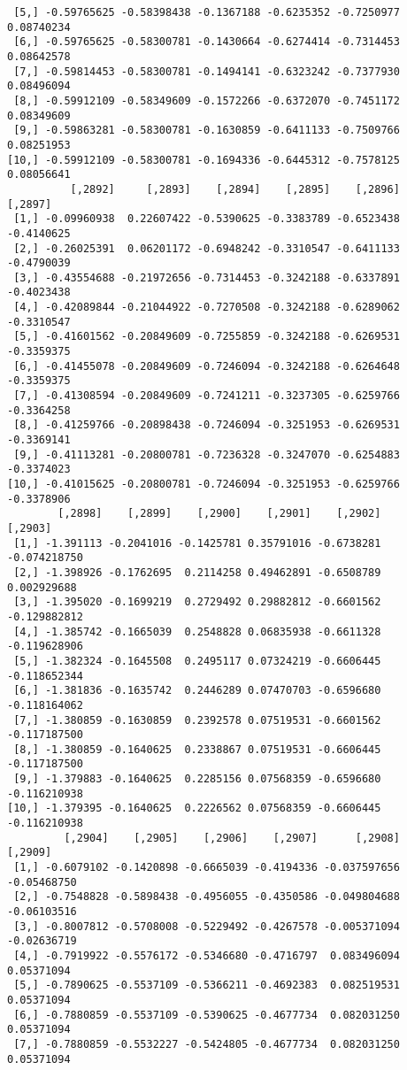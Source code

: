 \documentclass[
  letterpaper,
  DIV=11,
  numbers=noendperiod]{scrreprt}
\begin{document}
\begin{verbatim}
 [5,] -0.59765625 -0.58398438 -0.1367188 -0.6235352 -0.7250977  0.08740234
 [6,] -0.59765625 -0.58300781 -0.1430664 -0.6274414 -0.7314453  0.08642578
 [7,] -0.59814453 -0.58300781 -0.1494141 -0.6323242 -0.7377930  0.08496094
 [8,] -0.59912109 -0.58349609 -0.1572266 -0.6372070 -0.7451172  0.08349609
 [9,] -0.59863281 -0.58300781 -0.1630859 -0.6411133 -0.7509766  0.08251953
[10,] -0.59912109 -0.58300781 -0.1694336 -0.6445312 -0.7578125  0.08056641
          [,2892]     [,2893]    [,2894]    [,2895]    [,2896]    [,2897]
 [1,] -0.09960938  0.22607422 -0.5390625 -0.3383789 -0.6523438 -0.4140625
 [2,] -0.26025391  0.06201172 -0.6948242 -0.3310547 -0.6411133 -0.4790039
 [3,] -0.43554688 -0.21972656 -0.7314453 -0.3242188 -0.6337891 -0.4023438
 [4,] -0.42089844 -0.21044922 -0.7270508 -0.3242188 -0.6289062 -0.3310547
 [5,] -0.41601562 -0.20849609 -0.7255859 -0.3242188 -0.6269531 -0.3359375
 [6,] -0.41455078 -0.20849609 -0.7246094 -0.3242188 -0.6264648 -0.3359375
 [7,] -0.41308594 -0.20849609 -0.7241211 -0.3237305 -0.6259766 -0.3364258
 [8,] -0.41259766 -0.20898438 -0.7246094 -0.3251953 -0.6269531 -0.3369141
 [9,] -0.41113281 -0.20800781 -0.7236328 -0.3247070 -0.6254883 -0.3374023
[10,] -0.41015625 -0.20800781 -0.7246094 -0.3251953 -0.6259766 -0.3378906
        [,2898]    [,2899]    [,2900]    [,2901]    [,2902]      [,2903]
 [1,] -1.391113 -0.2041016 -0.1425781 0.35791016 -0.6738281 -0.074218750
 [2,] -1.398926 -0.1762695  0.2114258 0.49462891 -0.6508789  0.002929688
 [3,] -1.395020 -0.1699219  0.2729492 0.29882812 -0.6601562 -0.129882812
 [4,] -1.385742 -0.1665039  0.2548828 0.06835938 -0.6611328 -0.119628906
 [5,] -1.382324 -0.1645508  0.2495117 0.07324219 -0.6606445 -0.118652344
 [6,] -1.381836 -0.1635742  0.2446289 0.07470703 -0.6596680 -0.118164062
 [7,] -1.380859 -0.1630859  0.2392578 0.07519531 -0.6601562 -0.117187500
 [8,] -1.380859 -0.1640625  0.2338867 0.07519531 -0.6606445 -0.117187500
 [9,] -1.379883 -0.1640625  0.2285156 0.07568359 -0.6596680 -0.116210938
[10,] -1.379395 -0.1640625  0.2226562 0.07568359 -0.6606445 -0.116210938
         [,2904]    [,2905]    [,2906]    [,2907]      [,2908]     [,2909]
 [1,] -0.6079102 -0.1420898 -0.6665039 -0.4194336 -0.037597656 -0.05468750
 [2,] -0.7548828 -0.5898438 -0.4956055 -0.4350586 -0.049804688 -0.06103516
 [3,] -0.8007812 -0.5708008 -0.5229492 -0.4267578 -0.005371094 -0.02636719
 [4,] -0.7919922 -0.5576172 -0.5346680 -0.4716797  0.083496094  0.05371094
 [5,] -0.7890625 -0.5537109 -0.5366211 -0.4692383  0.082519531  0.05371094
 [6,] -0.7880859 -0.5537109 -0.5390625 -0.4677734  0.082031250  0.05371094
 [7,] -0.7880859 -0.5532227 -0.5424805 -0.4677734  0.082031250  0.05371094

\end{verbatim}
\end{document}
